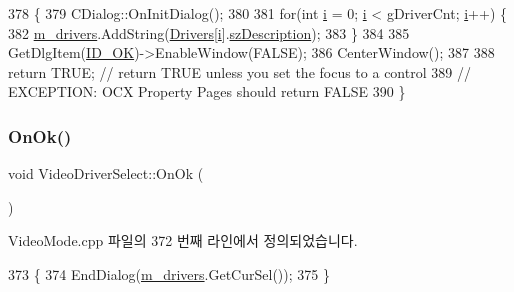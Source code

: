 \begin{DoxyCode}
378 \{
379   CDialog::OnInitDialog();
380   
381   \textcolor{keywordflow}{for}(\textcolor{keywordtype}{int} \mbox{\hyperlink{expr-lex_8cpp_acb559820d9ca11295b4500f179ef6392}{i}} = 0; \mbox{\hyperlink{expr-lex_8cpp_acb559820d9ca11295b4500f179ef6392}{i}} < gDriverCnt; \mbox{\hyperlink{expr-lex_8cpp_acb559820d9ca11295b4500f179ef6392}{i}}++) \{
382     \mbox{\hyperlink{class_video_driver_select_a6f3953363969c0e8a4c52f6247fb41d9}{m\_drivers}}.AddString(\mbox{\hyperlink{_video_mode_8cpp_aff7bc69820fcbd39d1537778da4f5d3e}{Drivers}}[\mbox{\hyperlink{expr-lex_8cpp_acb559820d9ca11295b4500f179ef6392}{i}}].\mbox{\hyperlink{_video_mode_8cpp_ac013d3a1126cbee383518915afb6c706}{szDescription}});
383   \}
384   
385   GetDlgItem(\mbox{\hyperlink{resource_8h_a4cf7b8af561e85b223c39c4c2b22ef18}{ID\_OK}})->EnableWindow(FALSE);      
386   CenterWindow();
387   
388   \textcolor{keywordflow}{return} TRUE;  \textcolor{comment}{// return TRUE unless you set the focus to a control}
389                 \textcolor{comment}{// EXCEPTION: OCX Property Pages should return FALSE}
390 \}
\end{DoxyCode}
\mbox{\label{class_video_driver_select_ac9cbbcd8f906e21b7f7fb5cce824b7b8}} 
\subsubsection{\texorpdfstring{On\+Ok()}{OnOk()}}
{\footnotesize\ttfamily void Video\+Driver\+Select\+::\+On\+Ok (\begin{DoxyParamCaption}{ }\end{DoxyParamCaption})\hspace{0.3cm}{\ttfamily [protected]}}



Video\+Mode.\+cpp 파일의 372 번째 라인에서 정의되었습니다.


\begin{DoxyCode}
373 \{
374   EndDialog(\mbox{\hyperlink{class_video_driver_select_a6f3953363969c0e8a4c52f6247fb41d9}{m\_drivers}}.GetCurSel());
375 \}
\end{DoxyCode}
\mbox{\label{class_video_driver_select_a2b1a9be6efd33676c0c6db48d24e9a55}} 
